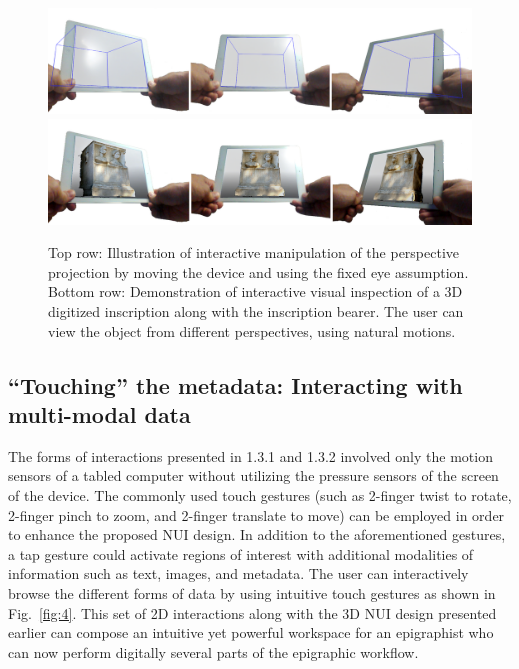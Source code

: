 \documentclass[amsthm,ebook]{saparticle}
\begin{document}
\begin{figure}[!bp]
\centering
 \includegraphics[width=\columnwidth]{EAGLE2016cameraready-img004.png}
 \includegraphics[width=\columnwidth]{EAGLE2016cameraready-img005.png}
\caption{Top row: Illustration of interactive manipulation of the perspective projection by moving the device and using
the {\textquotedbl}fixed eye{\textquotedbl} assumption. Bottom row: Demonstration of interactive visual inspection of a
3D digitized inscription along with the inscription bearer. The user can view the object from different perspectives,
using natural motions.}
\label{fig:3}
\end{figure}



\subsection{``Touching'' the metadata: Interacting with multi-modal data}


The forms of interactions presented in 1.3.1 and 1.3.2 involved only the motion sensors of a tabled computer without
utilizing the pressure sensors of the screen of the device. The commonly used touch gestures (such as 2-finger twist to
rotate, 2-finger pinch to zoom, and 2-finger translate to move) can be employed in order to enhance the proposed NUI
design. In addition to the aforementioned gestures, a tap gesture could activate regions of interest with additional
modalities of information such as text, images, and metadata. The user can interactively browse the different forms of
data by using intuitive touch gestures as shown in Fig.~\ref{fig:4}. This set of 2D interactions along with the 3D NUI design
presented earlier can compose an intuitive yet powerful workspace for an epigraphist who can now perform digitally
several parts of the epigraphic workflow. 
\end{document}

